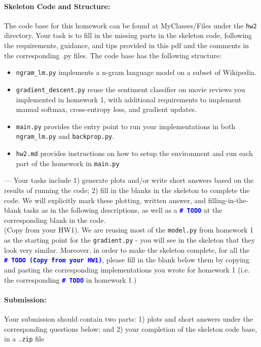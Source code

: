 \noindent \paragraph{Skeleton Code and Structure:}
The code base for this homework can be found at MyClasses/Files under the \texttt{hw2} directory. Your task is to fill in the missing parts in the skeleton code, following the requirements, guidance, and tips provided in this pdf and the comments in the corresponding .py files.
The code base has the following structure:
\begin{itemize}
    \item \texttt{ngram\_lm.py} implements a n-gram language model on a subset of Wikipedia. 
    \item \texttt{gradient\_descent.py} reuse the sentiment classifier on movie reviews you implemented in homework 1, with additional requirements to implement manual softmax, cross-entropy loss, and gradient updates.
    \item \texttt{main.py} provides the entry point to run your implementations in both \texttt{ngram\_lm.py} and \texttt{backprop.py}.
    \item \texttt{hw2.md} provides instructions on how to setup the environment and run each part of the homework in \texttt{main.py}
\end{itemize}


\noindent \todo{} ---
Your tasks include
1) generate plots and/or write short answers based on the results of running the code; 2) fill in the blanks in the skeleton to complete the code. We will explicitly mark these plotting, written answer, and filling-in-the-blank tasks as \todo{} in the following descriptions, as well as a \textcolor{blue}{\texttt{\textbf{\#~TODO}}} at the corresponding blank in the code. \\

\noindent \todo{} (Copy from your HW1). We are reusing most of the \texttt{model.py} from homework 1 as the starting point for the \texttt{gradient.py} - you will see in the skeleton that they look very similar. Moreover, in order to make the skeleton complete, for all the \textcolor{blue}{\texttt{\textbf{\#~TODO (Copy from your HW1)}}}, please fill in the blank below them by copying and pasting the corresponding implementations you wrote for homework 1 (i.e. the corresponding \textcolor{blue}{\texttt{\textbf{\#~TODO}}} in homework 1.)

\noindent \paragraph{Submission:} Your submission should contain two parts: 1) plots and short answers under the corresponding questions below; and 2) your completion of the skeleton code base, in a \texttt{.zip} file

